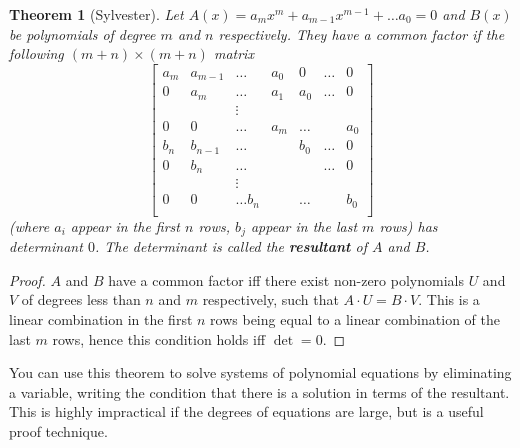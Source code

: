 \documentclass[12pt]{article}
\newtheorem{theorem}{Theorem}
\begin{document}
    \begin{theorem}[Sylvester]
        Let $A(x) = a_mx^m + a_{m-1}x^{m-1} + \dots a_0 = 0$ and $B(x)$ be polynomials of degree $m$ and $n$ respectively. They have a common factor if the following $(m+n) \times (m+n)$ matrix
        $$\begin{bmatrix}
            a_m & a_{m-1} & \dots & a_0 & 0 & \dots & 0 \\
            0 & a_m & \dots & a_1 & a_0 & \dots & 0 \\
            & & \vdots & & \\
            0 & 0 & \dots & a_m & \dots & & a_0 \\
            b_n & b_{n-1} & \dots & &  b_0 & \dots & 0 \\
            0 & b_n & \dots & & & \dots & 0 \\
            & & \vdots & & \\
            0 & 0 & \dots b_n & & \dots & & b_0 \\
        \end{bmatrix}$$
        (where $a_i$ appear in the first $n$ rows, $b_j$ appear in the last $m$ rows) has determinant $0$. The determinant is called the \textbf{resultant} of $A$ and $B$. 
    \end{theorem}
    \begin{proof}
        $A$ and $B$ have a common factor iff there exist non-zero polynomials $U$ and $V$ of degrees less than $n$ and $m$ respectively, such that $A\cdot U = B \cdot V$. This is a linear combination in the first $n$ rows being equal to a linear combination of the last $m$ rows, hence this condition holds iff $\det = 0$.  
    \end{proof}
    You can use this theorem to solve systems of polynomial equations by eliminating a variable, writing the condition that there is a solution in terms of the resultant. This is highly impractical if the degrees of equations are large, but is a useful proof technique. 

    
\end{document}
